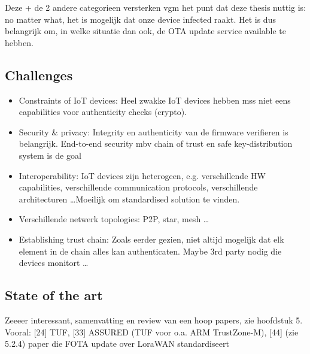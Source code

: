 Deze + de 2 andere categorieen versterken vgm het punt dat deze thesis nuttig is: no matter what, het is mogelijk dat onze device infected raakt. Het is dus belangrijk om, in welke situatie dan ook, de OTA update service available te hebben. \\
\subsection{Challenges}
\begin{itemize}
    \item Constraints of IoT devices: Heel zwakke IoT devices hebben mss niet eens capabilities voor authenticity checks (crypto).
    \item Security \& privacy: Integrity en authenticity van de firmware verifieren is belangrijk. End-to-end security mbv chain of trust en safe key-distribution system is de goal
    \item Interoperability: IoT devices zijn heterogeen, e.g. verschillende HW capabilities, verschillende communication protocols, verschillende architecturen \dots Moeilijk om standardised solution te vinden.
    \item Verschillende netwerk topologies: P2P, star, mesh \dots
    \item Establishing trust chain: Zoals eerder gezien, niet altijd mogelijk dat elk element in de chain alles kan authenticaten. Maybe 3rd party nodig die devices monitort \dots
\end{itemize}
\subsection{State of the art}
Zeeeer interessant, samenvatting en review van een hoop papers, zie hoofdstuk 5.\\
Vooral: [24] TUF, [33] ASSURED (TUF voor o.a. ARM TrustZone-M), [44] (zie 5.2.4) paper die FOTA update over LoraWAN standardiseert
